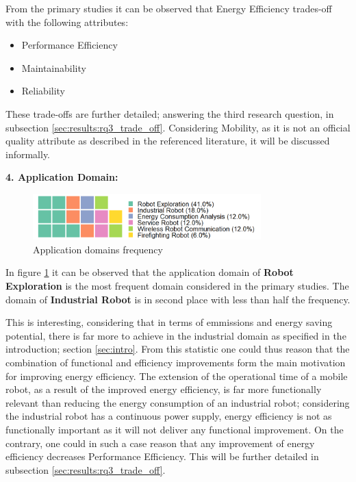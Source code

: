 \vspace{2mm}

From the primary studies it can be observed that Energy Efficiency trades-off with the following attributes:

\begin{itemize}
    \item Performance Efficiency
    \item Maintainability
    \item Reliability
\end{itemize}

These trade-offs are further detailed; answering the third research question, in subsection \ref{sec:results:rq3_trade_off}.
Considering Mobility, as it is not an official quality attribute 
as described in the referenced literature, it will be discussed informally.

\vspace{5mm}

\noindent\textbf{4. Application Domain:}
\begin{figure}[t]
    \includegraphics[width=250pt]{figures/waffle_appdomain_freq.png}
    \caption{Application domains frequency}
    \label{fig:app_domains}
\end{figure}
In figure \ref{fig:app_domains} it can be observed that the application domain of \textbf{Robot Exploration} is the most frequent
domain considered in the primary studies. 
The domain of \textbf{Industrial Robot} is in second place with less than half the frequency.

This is interesting, considering that in terms of emmissions and energy saving potential, there is far more to achieve in the industrial domain
as specified in the introduction; section \ref{sec:intro}.
From this statistic one could thus reason that the combination of functional and efficiency improvements form the main motivation for improving energy efficiency. 
The extension of the operational time of a mobile robot, as a result of the improved energy efficiency, 
is far more functionally relevant than reducing the energy consumption of an industrial robot;
considering the industrial robot has a continuous power supply, energy efficiency is not as functionally important as it will
not deliver any functional improvement.
On the contrary, one could in such a case reason that any improvement of energy efficiency decreases Performance Efficiency.
This will be further detailed in subsection \ref{sec:results:rq3_trade_off}.


